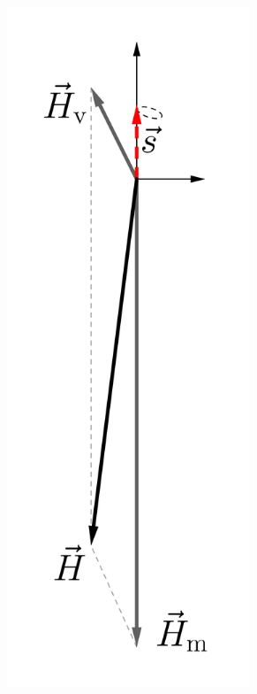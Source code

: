 \begin{figure}[htbp]
	\centering
	\begin{subfigure}[t]{0.3\textwidth}
		\centering
		\includegraphics[width=0.8\textwidth]{chapters/assets/basics/matter-effect-large-density}

\end{subfigure}
\end{figure}

